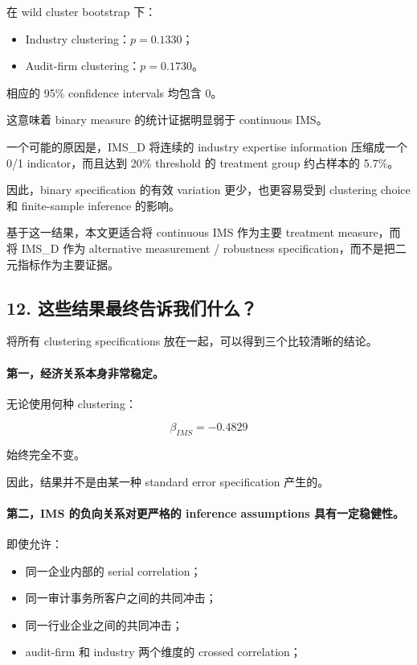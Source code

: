\documentclass[11pt]{article}
\begin{document}
在 wild cluster bootstrap 下：

\begin{itemize}
    \item Industry clustering：$p=0.1330$；
    \item Audit-firm clustering：$p=0.1730$。
\end{itemize}

相应的 95\% confidence intervals 均包含 0。

这意味着 binary measure 的统计证据明显弱于 continuous IMS。

一个可能的原因是，IMS\_D 将连续的 industry expertise information 压缩成一个 0/1 indicator，而且达到 20\% threshold 的 treatment group 约占样本的 5.7\%。

因此，binary specification 的有效 variation 更少，也更容易受到 clustering choice 和 finite-sample inference 的影响。

基于这一结果，本文更适合将 continuous IMS 作为主要 treatment measure，而将 IMS\_D 作为 alternative measurement / robustness specification，而不是把二元指标作为主要证据。

\subsection{12. 这些结果最终告诉我们什么？}

将所有 clustering specifications 放在一起，可以得到三个比较清晰的结论。

\paragraph{第一，经济关系本身非常稳定。}

无论使用何种 clustering：

\[
\boxed{\beta_{IMS}=-0.4829}
\]

始终完全不变。

因此，结果并不是由某一种 standard error specification 产生的。

\paragraph{第二，IMS 的负向关系对更严格的 inference assumptions 具有一定稳健性。}

即使允许：

\begin{itemize}
    \item 同一企业内部的 serial correlation；
    \item 同一审计事务所客户之间的共同冲击；
    \item 同一行业企业之间的共同冲击；
    \item audit-firm 和 industry 两个维度的 crossed correlation；
\end{itemize}
\end{document}
